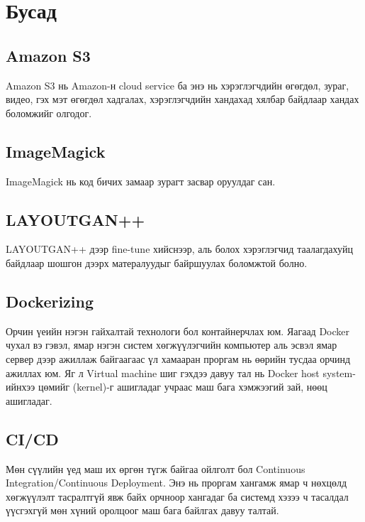 \section{Бусад}
\subsection{Amazon S3}
Amazon S3 нь Amazon-н cloud service ба энэ нь хэрэглэгчдийн өгөгдөл, зураг, видео, гэх мэт өгөгдөл хадгалах, хэрэглэгчдийн хандахад хялбар байдлаар хандах боломжийг олгодог.
\subsection{ImageMagick}
ImageMagick нь код бичих замаар зурагт засвар оруулдаг сан.
\subsection{LAYOUTGAN++}
LAYOUTGAN++ дээр fine-tune хийснээр, аль болох хэрэглэгчид таалагдахуйц байдлаар шошгон дээрх матералуудыг байршуулах боломжтой болно.
\subsection{Dockerizing}
Орчин үеийн нэгэн гайхалтай технологи бол контайнерчлах юм. Яагаад Docker чухал вэ гэвэл, ямар нэгэн систем хөгжүүлэгчийн компьютер аль эсвэл ямар сервер дээр ажиллаж байгаагаас үл хамааран проргам нь өөрийн тусдаа орчинд ажиллах юм. Яг л Virtual machine шиг гэхдээ давуу тал нь Docker host system-ийнхээ цөмийг (kernel)-г ашигладаг учраас маш бага хэмжээгий зай, нөөц ашигладаг.
\subsection{CI/CD}
Мөн сүүлийн үед маш их өргөн түгж байгаа ойлголт бол Continuous Integration/Continuous Deployment.
Энэ нь проргам хангамж ямар ч нөхцөлд хөгжүүлэлт тасралтгүй явж байх орчноор хангадаг ба системд хэзээ ч тасалдал үүсгэхгүй мөн хүний оролцоог маш бага байлгах давуу талтай.